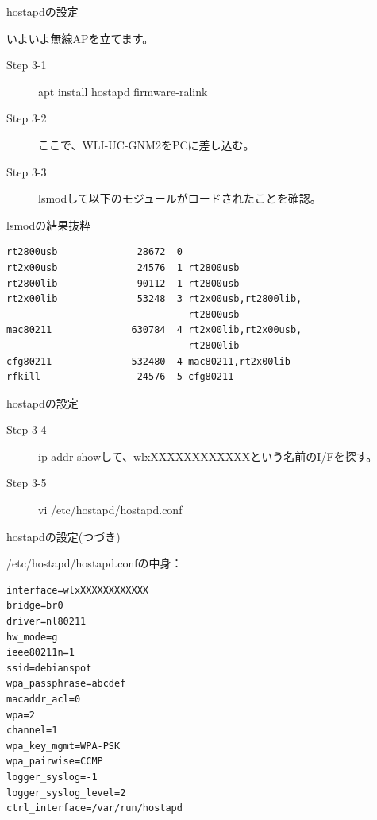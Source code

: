 \begin{frame}[containsverbatim]{hostapdの設定}

  いよいよ無線APを立てます。

  \begin{description}
  \item [Step 3-1] apt install hostapd firmware-ralink
  \item [Step 3-2] ここで、WLI-UC-GNM2をPCに差し込む。
  \item [Step 3-3] lsmodして以下のモジュールがロードされたことを確認。
  \end{description}      
 lsmodの結果抜粋
\begin{verbatim}
rt2800usb              28672  0
rt2x00usb              24576  1 rt2800usb
rt2800lib              90112  1 rt2800usb
rt2x00lib              53248  3 rt2x00usb,rt2800lib,
                                rt2800usb
mac80211              630784  4 rt2x00lib,rt2x00usb,
                                rt2800lib
cfg80211              532480  4 mac80211,rt2x00lib
rfkill                 24576  5 cfg80211
\end{verbatim}

\end{frame}

\begin{frame}[containsverbatim]{hostapdの設定}

  \begin{description}
  \item [Step 3-4] ip addr showして、wlxXXXXXXXXXXXXという名前のI/Fを探す。
  \item [Step 3-5] vi /etc/hostapd/hostapd.conf
  \end{description}      

\end{frame}


\begin{frame}[containsverbatim]{hostapdの設定(つづき)}

/etc/hostapd/hostapd.confの中身：
\begin{center}
\small
\begin{verbatim}
interface=wlxXXXXXXXXXXXX 
bridge=br0
driver=nl80211
hw_mode=g
ieee80211n=1
ssid=debianspot
wpa_passphrase=abcdef
macaddr_acl=0
wpa=2
channel=1
wpa_key_mgmt=WPA-PSK
wpa_pairwise=CCMP
logger_syslog=-1
logger_syslog_level=2
ctrl_interface=/var/run/hostapd
\end{verbatim}
\end{center}
\end{frame}

